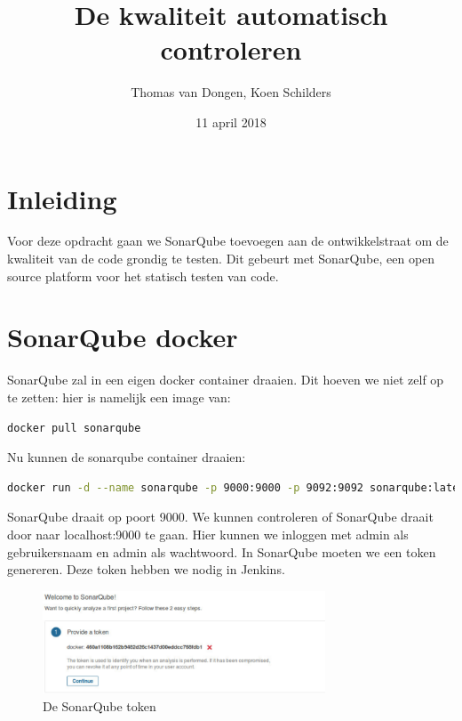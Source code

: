\documentclass[12pt]{article}
\title{De kwaliteit automatisch controleren}
\author{Thomas van Dongen, Koen Schilders}
\date{11 april 2018}
\begin{document}
\begin{titlepage}
\maketitle
\end{titlepage}

\section{Inleiding}
Voor deze opdracht gaan we SonarQube toevoegen aan de ontwikkelstraat om de kwaliteit van de code grondig te testen. Dit gebeurt met SonarQube, een open source platform voor het statisch testen van code.

\section{SonarQube docker}
SonarQube zal in een eigen docker container draaien. Dit hoeven we niet zelf op te zetten: hier is namelijk een image van:
\begin{lstlisting}[language=Bash]
docker pull sonarqube
\end{lstlisting}

Nu kunnen de sonarqube container draaien:
\begin{lstlisting}[language=Bash]
docker run -d --name sonarqube -p 9000:9000 -p 9092:9092 sonarqube:latest
\end{lstlisting}

SonarQube draait op poort 9000. We kunnen controleren of SonarQube draait door naar localhost:9000 te gaan. Hier kunnen we inloggen met admin als gebruikersnaam en admin als wachtwoord. In SonarQube moeten we een token genereren. Deze token hebben we nodig in Jenkins.

\begin{figure}[H]
	\begin{center}
		\includegraphics[width=0.75\textwidth]{images/sonarqube_token.PNG}
		\caption{De SonarQube token\label{fig:sonarqube_token}}
	\end{center}
\end{figure}
\end{document}
